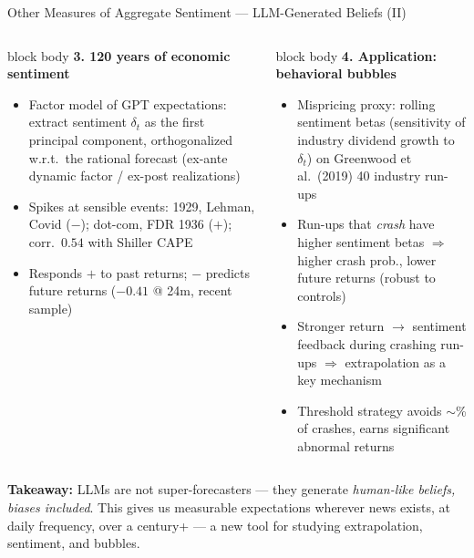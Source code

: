 \documentclass[aspectratio=169, 11pt]{beamer}
\begin{document}
\begin{frame}[shrink=10]{Other Measures of Aggregate Sentiment --- LLM-Generated Beliefs (II)}
\begin{columns}[T,onlytextwidth]
\begin{beamercolorbox}[rounded=true,sep=4pt]{block body}
\color{CityUBlue}\textbf{\small 3. 120 years of economic sentiment}
\begin{itemize}\setlength{\itemsep}{1pt}\footnotesize
  \item Factor model of GPT expectations: extract sentiment $\delta_t$ as the first principal component, orthogonalized w.r.t.\ the rational forecast (ex-ante dynamic factor / ex-post realizations)
  \item Spikes at sensible events: 1929, Lehman, Covid ($-$); dot-com, FDR 1936 ($+$); corr.\ $0.54$ with Shiller CAPE
  \item Responds $+$ to past returns; \textcolor{cinnabar}{$-$ predicts future returns} ($-0.41$ @ 24m, recent sample)
\end{itemize}
\end{beamercolorbox}

\begin{beamercolorbox}[rounded=true,sep=4pt]{block body}
\color{CityUBlue}\textbf{\small 4. Application: behavioral bubbles}
\begin{itemize}\setlength{\itemsep}{1pt}\footnotesize
  \item Mispricing proxy: rolling sentiment betas (sensitivity of industry dividend growth to $\delta_t$) on Greenwood et al.\ (2019) 40 industry run-ups
  \item Run-ups that \emph{crash} have \textcolor{cinnabar}{higher sentiment betas} $\Rightarrow$ higher crash prob., lower future returns (robust to controls)
  \item Stronger \textcolor{cinnabar}{return $\to$ sentiment feedback} during crashing run-ups $\Rightarrow$ extrapolation as a key mechanism
  \item Threshold strategy avoids $\sim$\% of crashes, earns significant abnormal returns
\end{itemize}
\end{beamercolorbox}
\end{columns}

\vspace{0.4em}
\begin{tcolorbox}[colback=cinnabar!8,colframe=cinnabar,boxrule=0.6pt,arc=2pt,left=4pt,right=4pt,top=3pt,bottom=3pt]
\footnotesize\textbf{\textcolor{cinnabar}{Takeaway:}} LLMs are not super-forecasters --- they generate \emph{human-like beliefs, biases included}. This gives us measurable expectations wherever news exists, at daily frequency, over a century+ --- a new tool for studying extrapolation, sentiment, and bubbles.
\end{tcolorbox}
\end{frame}
\end{document}
